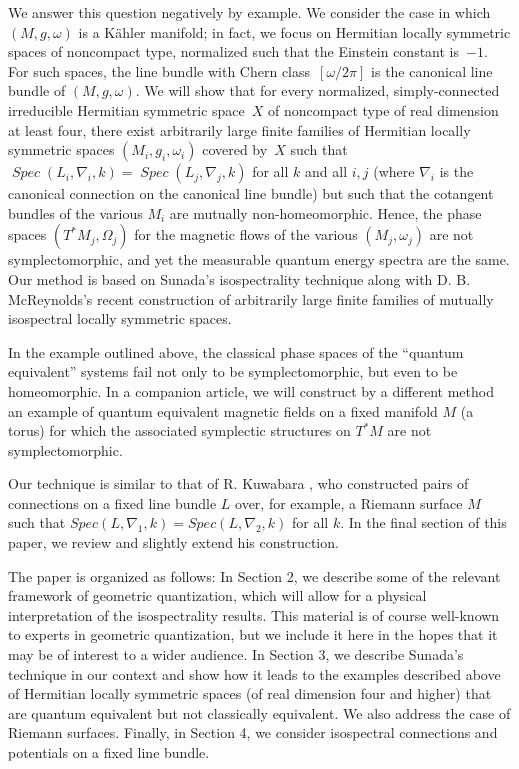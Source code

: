 \documentclass[12pt,leqno]{amsart}%
\theoremstyle{definition}
\theoremstyle{remark}
\numberwithin{equation}{section}
\def\nab{{\nabla}}
\def\Spec{\operatorname{\textit{Spec}}}
\begin{document}
We answer this question negatively by example.
We consider the case in which $(M,g,\omega)$ is a K\"{a}hler manifold;
in fact, we focus on Hermitian locally symmetric spaces of noncompact type,
normalized such that the Einstein constant is~$-1$.
For such spaces, the line bundle with Chern
class~$[\omega/2\pi]$ is the canonical line bundle of $(M,g,\omega)$. We will
show that for every normalized, simply-connected irreducible Hermitian
symmetric space~$X$
of noncompact type of real dimension at least four, there exist arbitrarily
large finite families of Hermitian locally symmetric spaces
$(M_{i},g_{i},\omega_{i})$ covered by~$X$ such that
${\Spec}(L_{i},\nabla_{i},k)={\Spec}(L_{j},\nabla_{j},k)$ for all $k$ and all
$i,j$ (where $\nab_i$ is the canonical connection on the canonical line bundle)
but such that the cotangent bundles of the various $M_{i}$ are mutually
non-homeomorphic.
Hence, the phase spaces $(T^*M_j, \Omega_j)$ for the magnetic flows of the
various
$(M_{j},\omega_{j})$ are not symplectomorphic, and yet the measurable quantum
energy spectra are the same.  Our method is based on Sunada's isospectrality
technique along with D. B. McReynolds's recent construction of arbitrarily large
finite families of mutually isospectral locally symmetric spaces.



In the example outlined above, the classical phase spaces of the ``quantum
equivalent'' systems fail not only to be symplectomorphic, but even to be
homeomorphic.
In a companion article, we will
construct by a different method an example of quantum equivalent magnetic fields
on a fixed manifold $M$ (a torus) for which the associated symplectic structures
on $T^*M$ are not symplectomorphic.

Our technique is similar to that of R. Kuwabara \cite{Ku90}, who constructed
pairs of connections on a fixed line bundle $L$ over, for example, a Riemann
surface $M$ such that $Spec(L,\nab_1,k)=Spec(L,\nab_2,k)$ for all $k$.   In the
final section of this paper, we review and slightly extend his construction.

The paper is organized as follows:  In Section 2, we describe some of the
relevant framework of geometric
quantization, which will allow for a physical interpretation of the
isospectrality
results. This material is of course well-known to experts in geometric
quantization, but
we include it here in the hopes that it may be of interest to a wider audience.
In Section 3, we describe Sunada's technique in our context and show how it
leads to the examples described above of Hermitian locally symmetric spaces (of
real dimension four and higher) that are quantum equivalent  but not classically
equivalent.  We also address the case of Riemann surfaces.  Finally, in Section
4, we consider isospectral connections and potentials on a fixed line bundle.
\end{document}
